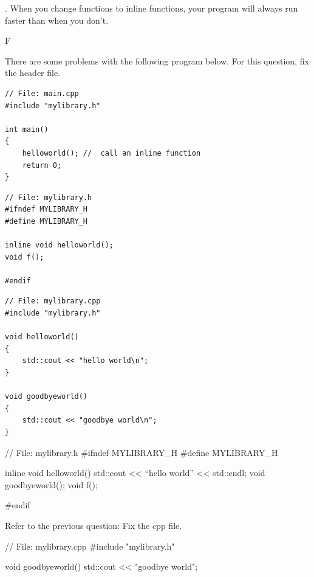 

\nextq
\tf. When you change functions to inline functions, your
program will always run faster than when you don't.
\\
\ANSWER
\begin{answercode}
F
\end{answercode}

\nextq
There are some problems with the following program below.
For this question, fix the header file.
\begin{Verbatim}[frame=single,fontsize=\footnotesize]
// File: main.cpp
#include "mylibrary.h"

int main()
{
    helloworld(); //  call an inline function
    return 0;
}
\end{Verbatim}
\begin{Verbatim}[frame=single,fontsize=\footnotesize]
// File: mylibrary.h
#ifndef MYLIBRARY_H
#define MYLIBRARY_H

inline void helloworld();
void f();

#endif
\end{Verbatim}
\begin{Verbatim}[frame=single,fontsize=\footnotesize]
// File: mylibrary.cpp
#include "mylibrary.h"

void helloworld()
{
    std::cout << "hello world\n";
}

void goodbyeworld()
{
    std::cout << "goodbye world\n";
}
\end{Verbatim}
\ANSWER
\begin{answercode}
// File: mylibrary.h
#ifndef MYLIBRARY_H
#define MYLIBRARY_H

inline void helloworld()
{
  std::cout << ``hello world'' << std::endl;
}
void goodbyeworld();
void f();

#endif
\end{answercode}

\nextq
Refer to the previous question: Fix the cpp file.
\\
\ANSWER
\begin{answercode}
// File: mylibrary.cpp
#include "mylibrary.h"

void goodbyeworld()
{
    std::cout << "goodbye world\n";
}
\end{answercode}


